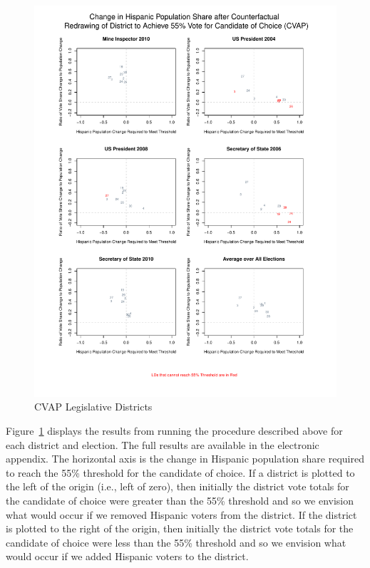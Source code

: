 \documentclass[12pt]{article}
\begin{document}
\begin{figure}[p!h]
\begin{center}
\includegraphics[scale=.8]{figs/cvap_ld_performance_ratio.pdf}
\caption{\label{cvap_ld_performance_ratio}CVAP Legislative Districts}
\end{center}
\end{figure}

Figure~\ref{cvap_ld_performance_ratio} displays the results from running the procedure described above for each district and election. The full results are available in the electronic appendix. The horizontal axis is the change in Hispanic population share required to reach the 55\% threshold for the candidate of choice. If a district is plotted to the left of the origin (i.e., left of zero), then  initially the district vote totals for the candidate of choice were greater than the 55\% threshold and so we envision what would occur if we removed Hispanic voters from the district. If the district is plotted to the right of the origin, then initially the district vote totals for the candidate of choice were less than the 55\% threshold and so we envision what would occur if we added Hispanic voters to the district.
\end{document}

